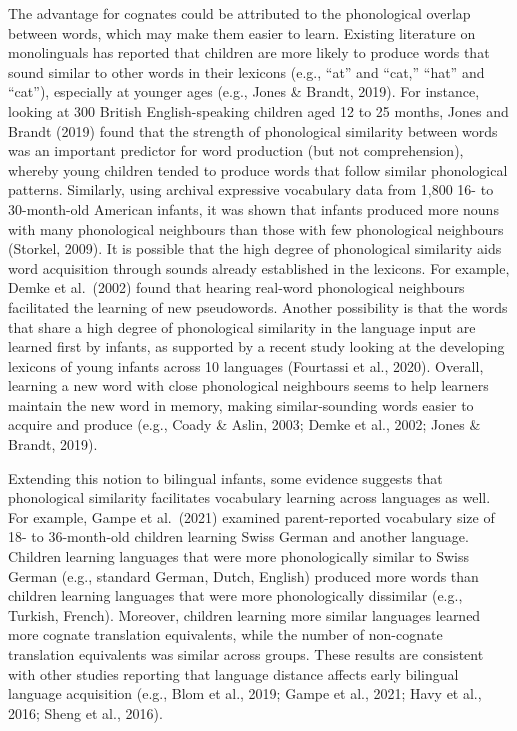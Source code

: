 \documentclass[
  ,man,floatsintext]{apa6}
\begin{document}
The advantage for cognates could be attributed to the phonological overlap between words, which may make them easier to learn. Existing literature on monolinguals has reported that children are more likely to produce words that sound similar to other words in their lexicons (e.g., ``at'' and ``cat,'' ``hat'' and ``cat''), especially at younger ages (e.g., Jones \& Brandt, 2019). For instance, looking at 300 British English-speaking children aged 12 to 25 months, Jones and Brandt (2019) found that the strength of phonological similarity between words was an important predictor for word production (but not comprehension), whereby young children tended to produce words that follow similar phonological patterns. Similarly, using archival expressive vocabulary data from 1,800 16- to 30-month-old American infants, it was shown that infants produced more nouns with many phonological neighbours than those with few phonological neighbours (Storkel, 2009). It is possible that the high degree of phonological similarity aids word acquisition through sounds already established in the lexicons. For example, Demke et al.~(2002) found that hearing real-word phonological neighbours facilitated the learning of new pseudowords. Another possibility is that the words that share a high degree of phonological similarity in the language input are learned first by infants, as supported by a recent study looking at the developing lexicons of young infants across 10 languages (Fourtassi et al., 2020). Overall, learning a new word with close phonological neighbours seems to help learners maintain the new word in memory, making similar-sounding words easier to acquire and produce (e.g., Coady \& Aslin, 2003; Demke et al., 2002; Jones \& Brandt, 2019).

Extending this notion to bilingual infants, some evidence suggests that phonological similarity facilitates vocabulary learning across languages as well. For example, Gampe et al.~(2021) examined parent-reported vocabulary size of 18- to 36-month-old children learning Swiss German and another language. Children learning languages that were more phonologically similar to Swiss German (e.g., standard German, Dutch, English) produced more words than children learning languages that were more phonologically dissimilar (e.g., Turkish, French). Moreover, children learning more similar languages learned more cognate translation equivalents, while the number of non-cognate translation equivalents was similar across groups. These results are consistent with other studies reporting that language distance affects early bilingual language acquisition (e.g., Blom et al., 2019; Gampe et al., 2021; Havy et al., 2016; Sheng et al., 2016).
\end{document}
